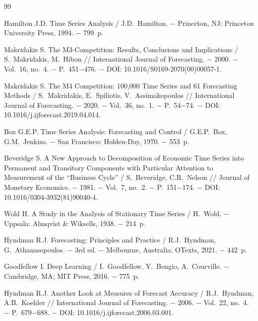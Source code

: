 \documentclass[a4paper,14pt]{extarticle}
\begin{document}
\newpage
{}
{}
\renewcommand{\refname}{Список литературы}
\makeatletter
\renewcommand{\@biblabel}[1]{#1.}
\makeatother
\begin{thebibliography}{99}

 Hamilton J.D. Time Series Analysis / J.D.~Hamilton. − Princeton, NJ: Princeton University Press, 1994. − 799~p.

 Makridakis S. The M3-Competition: Results, Conclusions and Implications / S.~Makridakis, M.~Hibon // International Journal of Forecasting. − 2000. − Vol.~16, no.~4. − P.~451−476. − DOI: 10.1016/S0169-2070(00)00057-1.

 Makridakis S. The M4 Competition: 100,000 Time Series and 61 Forecasting Methods / S.~Makridakis, E.~Spiliotis, V.~Assimakopoulos // International Journal of Forecasting. − 2020. − Vol.~36, no.~1. − P.~54−74. − DOI: 10.1016/j.ijforecast.2019.04.014.

 Box G.E.P. Time Series Analysis: Forecasting and Control / G.E.P.~Box, G.M.~Jenkins. − San Francisco: Holden-Day, 1970. − 553~p.

 Beveridge S. A New Approach to Decomposition of Economic Time Series into Permanent and Transitory Components with Particular Attention to Measurement of the ``Business Cycle'' / S.~Beveridge, C.R.~Nelson // Journal of Monetary Economics. − 1981. − Vol.~7, no.~2. − P.~151−174. − DOI: 10.1016/0304-3932(81)90040-4.

 Wold H. A Study in the Analysis of Stationary Time Series / H.~Wold. − Uppsala: Almqvist \& Wiksells, 1938. − 214~p.

 Hyndman R.J. Forecasting: Principles and Practice / R.J.~Hyndman, G.~Athanasopoulos. − 3rd ed. − Melbourne, Australia: OTexts, 2021. − 442~p.

 Goodfellow I. Deep Learning / I.~Goodfellow, Y.~Bengio, A.~Courville. − Cambridge, MA: MIT Press, 2016. − 775~p.

 Hyndman R.J. Another Look at Measures of Forecast Accuracy / R.J.~Hyndman, A.B.~Koehler // International Journal of Forecasting. − 2006. − Vol.~22, no.~4. − P.~679−688. − DOI: 10.1016/j.ijforecast.2006.03.001.


\end{thebibliography}
\end{document}

